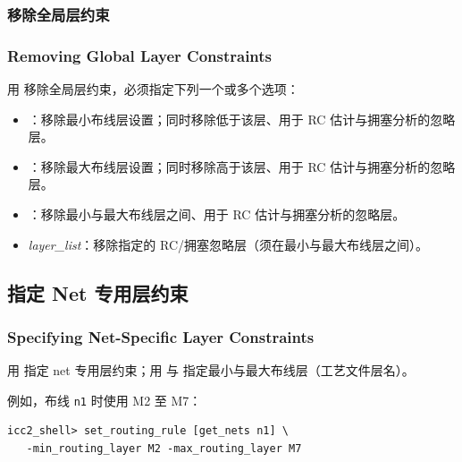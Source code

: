 \subsubsection{移除全局层约束}
\subsubsection*{Removing Global Layer Constraints}

用  移除全局层约束，必须指定下列一个或多个选项：
\begin{itemize}
  \item {}：移除最小布线层设置；同时移除低于该层、用于 RC 估计与拥塞分析的忽略层。
  \item {}：移除最大布线层设置；同时移除高于该层、用于 RC 估计与拥塞分析的忽略层。
  \item {}：移除最小与最大布线层之间、用于 RC 估计与拥塞分析的忽略层。
  \item {} \textit{layer\_list}：移除指定的 RC/拥塞忽略层（须在最小与最大布线层之间）。
\end{itemize}

\subsection{指定 Net 专用层约束}
\subsubsection*{Specifying Net-Specific Layer Constraints}

用  指定 net 专用层约束；用  与  指定最小与最大布线层（工艺文件层名）。

例如，布线 \texttt{n1} 时使用 M2 至 M7：
\begin{lstlisting}
icc2_shell> set_routing_rule [get_nets n1] \
   -min_routing_layer M2 -max_routing_layer M7
\end{lstlisting}

